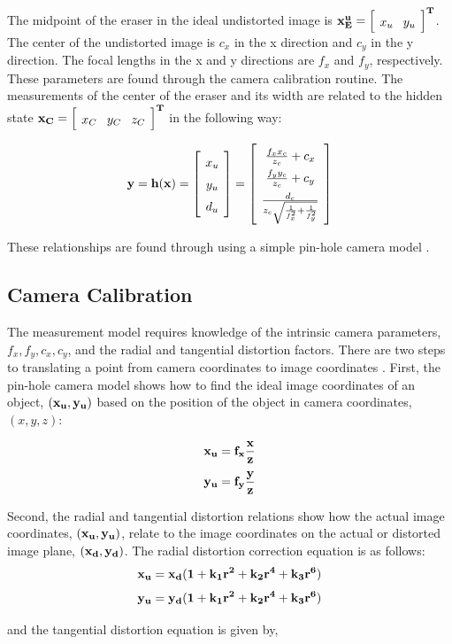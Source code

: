 \documentclass{article}
\newcommand{\mat}[2][ccccccccccccccccccccccccccccccccccccccccccccc]{\left[
        \arraycolsep=4pt\def\arraystretch{1.5}
        \begin{array}{#1} #2 \\ 
        \end{array} 
        \right]}
\begin{document}
\begin{flushleft}
\medskip

The midpoint of the eraser in the ideal undistorted image is $\bf{x^u_E} = \mat{ x_u & y_u }^{T}$. The center of the undistorted image is $c_x$ in the x direction and $c_y$ in the y direction. The focal lengths in the x and y directions are $f_x$ and $f_y$, respectively. These parameters are found through the camera calibration routine. The measurements of the center of the eraser and its width are related to the hidden state $\bf{\bf{x_C}} = \mat{ x_C & y_C & z_C }^{T}$ in the following way: 

\[
    \bf{\bf{y}} = h(\bf{\bf{x}})
        = \mat{x_u \\ y_u \\ d_{u} }
        = \mat{ \frac{f_x x_c}{z_c} + c_x \\ 
             \frac{f_y y_c}{z_c} + c_y \\ 
             \frac{d_c}{z_c \sqrt{\frac{1}{f_x^{2}} + \frac{1}{f_y^{2}}}}
           }
\]

These relationships are found through using a simple pin-hole camera model \cite{Tsai1987}.

\subsection{Camera Calibration}

The measurement model requires knowledge of the intrinsic camera parameters, $f_x, f_y, c_x, c_y$, and the radial and tangential distortion factors. There are two steps to translating a point from camera coordinates to image coordinates \cite{Tsai1987}. First, the pin-hole camera model shows how to find the ideal image coordinates of an object, $(\bf{x_u}, \bf{y_u})$ based on the position of the object in camera coordinates, $(x, y, z)$: 

$$ \bf{x_u} = f_x \frac{x}{z} $$
$$ \bf{y_u} = f_y \frac{y}{z} $$

Second, the radial and tangential distortion relations show how the actual image coordinates, $(\bf{x_u}, \bf{y_u})$, relate to the image coordinates on the actual or distorted image plane, $(\bf{x_d}, \bf{y_d})$. The radial distortion correction equation is as follows: \\

$$ \bf{x_u} = x_d (1 + k_1 r^2 + k_2 r^4 + k_3 r^6) $$
$$ \bf{y_u} = y_d (1 + k_1 r^2 + k_2 r^4 + k_3 r^6) $$

and the tangential distortion equation is given by, 


\end{flushleft}
\end{document}
